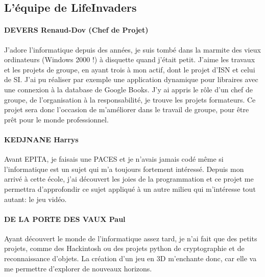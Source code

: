 \subsection{L'équipe de LifeInvaders}
\vspace{0.5cm}

    \paragraph{DEVERS Renaud-Dov (Chef de Projet)}
    J'adore l'informatique depuis des années, je suis tombé dans la marmite des vieux ordinateurs (Windows 2000 !) à disquette quand j'était petit.
    J'aime les travaux et les projets de groupe, en ayant trois à mon actif, dont le projet d'ISN et celui de SI. J'ai pu réaliser par exemple une application dynamique pour libraires avec une connexion à la database de Google Books.
    J'y ai appris le rôle d'un chef de groupe, de l'organisation à la responsabilité, je trouve les projets formateurs.
    Ce projet sera donc l'occasion de m'améliorer dans le travail de groupe, pour être prêt pour le monde professionnel.
    \vspace{0.5cm}


    \paragraph{KEDJNANE Harrys}
    Avant EPITA, je faisais une PACES et je n’avais jamais codé même si l’informatique est un sujet qui m’a toujours fortement intéressé. Depuis mon arrivé à cette école, j’ai découvert les joies de la programmation et ce projet me permettra d’approfondir ce sujet appliqué à un autre milieu qui m’intéresse tout autant: le jeu vidéo. 
    \vspace{0.5cm}

    \paragraph{DE LA PORTE DES VAUX Paul}
    Ayant découvert le monde de l’informatique assez tard, je n’ai fait que des petits projets, comme des Hackintosh ou des projets python de cryptographie et de reconnaissance d’objets.
    La création d’un jeu en 3D m’enchante donc, car elle va me permettre d’explorer de nouveaux horizons.
    \vspace{0.5cm}

